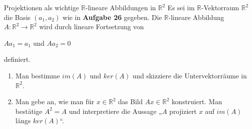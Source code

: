 \documentclass{uebblatt}
\begin{document}
\begin{aufgabe}{Projektionen als wichtige $\mathbb{R}$-lineare Abbildungen in $\mathbb{R}^2$}
Es sei im $\mathbb{R}$-Vektorraum $\mathbb{R}^2$ die Basis $(a_1, a_2)$ wie in \textbf{Aufgabe 26} gegeben. Die $\mathbb{R}$-lineare Abbildung $A: \mathbb{R}^2 \to \mathbb{R}^2$ wird durch lineare Fortsetzung von
\begin{center}
$Aa_1 = a_1$ und $Aa_2 = 0$
\end{center}
definiert.
\begin{enumerate}
\item Man bestimme $im(A)$ und $ker(A)$ und skizziere die Untervektorräume in $\mathbb{R}^2$.
\item Man gebe an, wie man für $x \in \mathbb{R}^2$ das Bild $Ax \in \mathbb{R}^2$ konstruiert. Man bestätige $A^2 = A$ und interpretiere die Aussage „$A$ projiziert $x$ auf $im(A)$ längs $ker(A)$“.
\end{enumerate}
\end{aufgabe}
\end{document}
